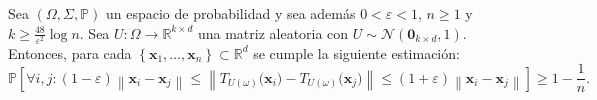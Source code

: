 \begin{theorem}\label{thm:johnson-lindenstrauss}
	Sea $\left(\Omega,\Sigma,\mathbb{P}\right)$ un espacio de
	probabilidad y sea además $0<\varepsilon<1$, $n\geq 1$ y
	$k\geq\frac{48}{\varepsilon^2}\log n$.
	Sea $U\colon\Omega\to\mathbb{R}^{k\times d}$ una matriz aleatoria
	con $U\sim\mathcal{N}\left(\symbf{0}_{k\times d},1\right)$.
	Entonces, para cada
	\begin{math}
		\left\{
		\symbf{x}_{1},
		\dotsc,
		\symbf{x}_{n}
		\right\}\subset\mathbb{R}^{d}
	\end{math}
	se cumple la siguiente estimación:
	\begin{equation*}
		\mathbb{P}
		\left[
			\forall i,j:
			\left(1-\varepsilon\right)
			\left\|
			\symbf{x}_{i}-
			\symbf{x}_{j}
			\right\|\leq
			\left\|
			T_{U\left(\omega\right)}\big(\symbf{x}_{i}\big)-
			T_{U\left(\omega\right)}\big(\symbf{x}_{j}\big)
			\right\|\leq
			\left(1+\varepsilon\right)
			\left\|
			\symbf{x}_{i}-
			\symbf{x}_{j}
			\right\|
			\right]\geq
		1-\frac{1}{n}.
	\end{equation*}
\end{theorem}

